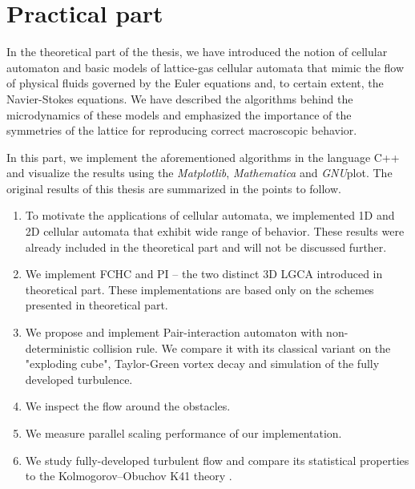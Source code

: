 

\chapter{Practical part}
In the theoretical part of the thesis, we have introduced the notion of cellular automaton and basic models of lattice-gas cellular automata that mimic the flow of physical fluids governed by the Euler equations and, to certain extent, the Navier-Stokes equations.
We have described the algorithms behind the microdynamics of these models and emphasized the importance of the symmetries of the lattice for reproducing correct macroscopic behavior.

In this part, we implement the aforementioned algorithms in the language C++ and visualize the results using the \textit{Matplotlib}, \textit{Mathematica} and \textit{GNU}plot. The original results of this thesis are summarized in the points to follow.

\begin{enumerate}
\item To motivate the applications of cellular automata, we implemented 1D and 2D cellular automata that exhibit wide range of behavior. These results were already included in the theoretical part and will not be discussed further.
\item We implement FCHC and PI -- the two distinct 3D LGCA introduced in theoretical part. These implementations are based only on the schemes presented in theoretical part.
\item We propose and implement Pair-interaction automaton with non-determi\-nistic collision rule. We compare it with its classical variant on the "exploding cube", Taylor-Green vortex decay and simulation of the fully developed turbulence.
\item We inspect the flow around the obstacles.
\item We measure parallel scaling performance of our implementation.
\item We study fully-developed turbulent flow and compare its statistical pro\-perties to the Kolmogorov--Obuchov K41 theory \cite{turb}.

\end{enumerate}